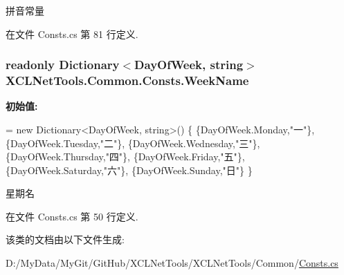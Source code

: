 拼音常量 



在文件 Consts.\-cs 第 81 行定义.

\hypertarget{class_x_c_l_net_tools_1_1_common_1_1_consts_a1ceb25b42170e8a15fe9953a531c497e}{
\subsubsection[{Week\-Name}]{\setlength{\rightskip}{0pt plus 5cm}readonly Dictionary$<$Day\-Of\-Week, string$>$ X\-C\-L\-Net\-Tools.\-Common.\-Consts.\-Week\-Name\hspace{0.3cm}{\ttfamily [static]}}}\label{class_x_c_l_net_tools_1_1_common_1_1_consts_a1ceb25b42170e8a15fe9953a531c497e}
{\bfseries 初始值\-:}
\begin{DoxyCode}
= \textcolor{keyword}{new} Dictionary<DayOfWeek, string>() \{
            \{DayOfWeek.Monday,\textcolor{stringliteral}{"一"}\},
            \{DayOfWeek.Tuesday,\textcolor{stringliteral}{"二"}\},
            \{DayOfWeek.Wednesday,\textcolor{stringliteral}{"三"}\},
            \{DayOfWeek.Thursday,\textcolor{stringliteral}{"四"}\},
            \{DayOfWeek.Friday,\textcolor{stringliteral}{"五"}\},
            \{DayOfWeek.Saturday,\textcolor{stringliteral}{"六"}\},
            \{DayOfWeek.Sunday,\textcolor{stringliteral}{"日"}\}
        \}
\end{DoxyCode}


星期名 



在文件 Consts.\-cs 第 50 行定义.



该类的文档由以下文件生成\-:\begin{DoxyCompactItemize}
\item 
D\-:/\-My\-Data/\-My\-Git/\-Git\-Hub/\-X\-C\-L\-Net\-Tools/\-X\-C\-L\-Net\-Tools/\-Common/\hyperlink{_consts_8cs}{Consts.\-cs}\end{DoxyCompactItemize}
